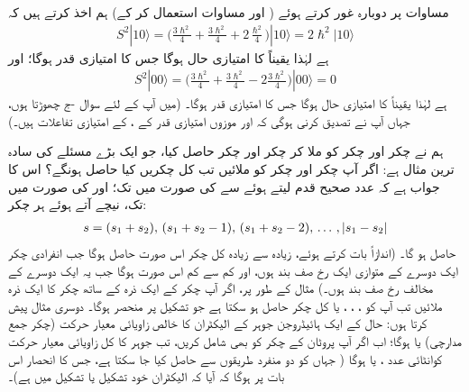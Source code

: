  مساوات    پر دوبارہ غور کرتے ہوئے ( اور مساوات  استعمال کر کے)  ہم   اخذ کرتے ہیں کہ 
\begin{align}\label{مساوات_تین_ابعاد_ایک_صفر_بعد_درکار}
S^2 | 1 0 \rangle = \big ( \frac{3\hslash^2}{4} + \frac{3\hslash^2}{4} +2 \frac{ \hslash^2}{4} \big ) | 1 0 \rangle =2\hslash^2 |1 0\rangle
\end{align}
ہے لہٰذا  یقیناً  کا امتیازی حال ہوگا جس کا امتیازی قدر  ہوگا؛  اور 
\begin{align}
S^2 | 0 0 \rangle = \big ( \frac{3\hslash^2}{4} + \frac{3\hslash^2}{4} -2 \frac{3 \hslash^2}{4} \big ) | 0 0 \rangle =0
\end{align}
ہے  لہٰذا  یقیناً  کا امتیازی حال ہوگا جس کا امتیازی قدر  ہوگا۔  (میں آپ کے لئے سوال -ج  چھوڑتا   ہوں،  جہاں آپ نے تصدیق کرنی  ہوگی کہ  اور موزوں  امتیازی قدر کے ،   کے امتیازی تفاعلات ہیں۔)

 ہم نے  چکر اور  چکر کو ملا کر    چکر اور    چکر حاصل کیا،  جو ایک  بڑے مسئلے کی سادہ ترین مثال ہے:  اگر آپ  چکر اور  چکر کو ملائیں  تب کل چکریں   کیا  حاصل ہونگے؟   اس کا جواب  ہے کہ عدد صحیح قدم لیتے ہوئے  سے  کی صورت میں  تک؛  اور  کی صورت میں  تک،  نیچے آتے ہوئے  ہر چکر: 
\begin{align}
s=(s_1+s_2), \,(s_1+s_2-1),\, (s_1+s_2-2), \,\dotsc \, , \,\abs{s_1-s_2}
\end{align}
حاصل ہو گا۔ (اندازاً بات کرتے ہوئے، زیادہ سے زیادہ  کل چکر اس صورت حاصل ہوگا جب انفرادی چکر ایک دوسرے کے متوازی ایک رخ صف بند ہوں،  اور کم سے کم اس صورت ہوگا جب یہ ایک دوسرے کے مخالف رخ صف بند ہوں۔)  مثال کے طور پر،  اگر آپ  چکر کے ایک ذرہ کے ساتھ    چکر کا  ایک ذرہ  ملائیں تب آپ کو ،  ،  ،  یا   کل چکر حاصل ہو  سکتا ہے  جو  تشکیل  پر منحصر ہوگا۔  دوسری مثال پیش کرتا ہوں:  حال  کے ایک ہائیڈروجن جوہر کے الیکٹران کا خالص  زاویائی معیار حرکت (چکر
 جمع مدارچی)   یا  ہوگا؛  اب اگر آپ پروٹان کے چکر کو بھی شامل کریں، تب جوہر کا کل زاویائی معیار حرکت کوانٹائی عدد ،   یا  ہوگا ( جہاں  کو دو منفرد طریقوں سے حاصل کیا جا سکتا ہے، جس کا انحصار اس بات پر ہوگا کہ آیا کہ الیکٹران خود     تشکیل یا  تشکیل  میں  ہے)۔

